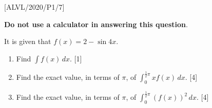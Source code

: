 \item {[}ALVL/2020/P1/7{]}

\textbf{Do not use a calculator in answering this question}. 

It is given that $f\left(x\right)=2-\sin4x$. 
\begin{enumerate}
\item Find $\int f\left(x\right)\,dx$. \hfill{}{[}1{]}
\item Find the exact value, in terms of $\pi$, of $\int_{0}^{\frac{1}{2}\pi}xf\left(x\right)\,dx$.\hfill{}
{[}4{]}
\item Find the exact value, in terms of $\pi$, of $\int_{0}^{\frac{1}{2}\pi}\left(f\left(x\right)\right)^{2}\,dx$.
\hfill{}{[}4{]}
\end{enumerate}
